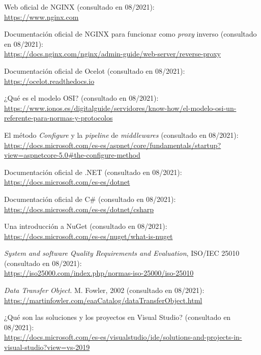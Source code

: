 \documentclass[11pt,spanish,listoffigures]{tfgetsinf}
\begin{document}
\begin{thebibliography}{10}
Web oficial de NGINX (consultado en 08/2021):\\
\url{https://www.nginx.com}

Documentación oficial de NGINX para funcionar como \emph{proxy} inverso (consultado en 08/2021):\\
\url{https://docs.nginx.com/nginx/admin-guide/web-server/reverse-proxy}

Documentación oficial de Ocelot (consultado en 08/2021):\\
\url{https://ocelot.readthedocs.io}

¿Qué es el modelo OSI? (consultado en 08/2021):\\
\url{https://www.ionos.es/digitalguide/servidores/know-how/el-modelo-osi-un-referente-para-normas-y-protocolos}

El método \emph{Configure} y la \emph{pipeline} de \emph{middlewares} (consultado en 08/2021):\\
\url{https://docs.microsoft.com/es-es/aspnet/core/fundamentals/startup?view=aspnetcore-5.0#the-configure-method}

Documentación oficial de .NET (consultado en 08/2021):\\
\url{https://docs.microsoft.com/es-es/dotnet}

Documentación oficial de C\# (consultado en 08/2021):\\
\url{https://docs.microsoft.com/es-es/dotnet/csharp}

Una introducción a NuGet (consultado en 08/2021):\\
\url{https://docs.microsoft.com/es-es/nuget/what-is-nuget}

\emph{System and software Quality Requirements and Evaluation}, ISO/IEC 25010 (consultado en 08/2021):\\
\url{https://iso25000.com/index.php/normas-iso-25000/iso-25010}

\emph{Data Transfer Object}.
\newblock M. Fowler, 2002 (consultado en 08/2021):\\
\url{https://martinfowler.com/eaaCatalog/dataTransferObject.html}

¿Qué son las soluciones y los proyectos en Visual Studio? (consultado en 08/2021):\\
\url{https://docs.microsoft.com/es-es/visualstudio/ide/solutions-and-projects-in-visual-studio?view=vs-2019}


\end{thebibliography}
\end{document}
